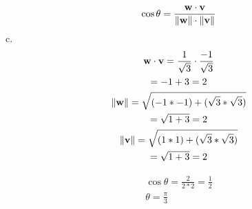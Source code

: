 \documentclass{report}
\begin{document}
\begin{question}{7}{}
    \begin{gather*}
        \cos \theta = \displaystyle\frac{\mathbf{w} \cdot \mathbf{v}}{\lVert \mathbf{w} \rVert \cdot \lVert \mathbf{v} \rVert}
    \end{gather*}
    c.
    \begin{gather*}
        \mathbf{w} \cdot \mathbf{v} = \frac{1}{\sqrt{3}} \cdot \frac{-1}{\sqrt{3}} \\
        = -1 + 3 = 2 \\
        \lVert \mathbf{w} \rVert = \sqrt{(-1 * -1) + (\sqrt{3} * \sqrt{3}) } \\
        = \sqrt{1 + 3 } = 2 \\
        \lVert \mathbf{v} \rVert = \sqrt{(1 * 1) + (\sqrt{3} * \sqrt{3}) } \\
        = \sqrt{1 + 3 } = 2
    \end{gather*}

    \begin{gather*}
        \cos \theta = \frac{2}{2*2} = \frac{1}{2} \\
        \theta = \frac{\pi}{3}
    \end{gather*}
\end{question}
\end{document}
